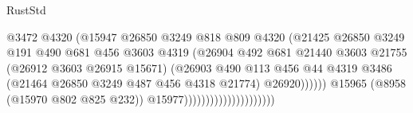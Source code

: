 \begin{lexlean}{RustStd}
\begin{coremodule}
                                                  @3472
                                                  @4320
                                                  (@15947
                                                    @26850
                                                    @3249
                                                    @818
                                                    @809
                                                    @4320
                                                    (@21425
                                                      @26850
                                                      @3249
                                                      @191
                                                      @490
                                                      @681
                                                      @456
                                                      @3603
                                                      @4319
                                                      (@26904
                                                        @492
                                                        @681
                                                        @21440
                                                        @3603
                                                        @21755
                                                        (@26912 @3603 @26915 @15671)
                                                        (@26903
                                                          @490
                                                          @113
                                                          @456
                                                          @44
                                                          @4319
                                                          @3486
                                                          (@21464
                                                            @26850
                                                            @3249
                                                            @487
                                                            @456
                                                            @4318
                                                            @21774)
                                                          @26920))))))
                                              @15965
                                              (@8958 (@15970 @802 @825 @232))
                                              @15977)))))))))))))))))))))

\end{coremodule}
\end{lexlean}
